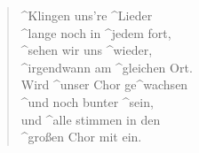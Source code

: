 \documentclass{leadsheet}
\begin{document}
\begin{song}
\begin{multicols}{2}
    \begin{chorus}[after-label=]\end{chorus}


    \begin{verse}
      ^Klingen uns're ^Lieder \\
      ^lange noch in ^jedem fort, \\
      ^sehen wir uns ^wieder, \\
      ^irgendwann am ^gleichen Ort. \\
      Wird ^unser Chor ge^wachsen \\
      ^und noch bunter ^sein, \\
      und ^alle stimmen in den  \\
      ^großen Chor mit ein. \\
    \end{verse}

    \begin{chorus}[after-label=]\end{chorus}

  \end{multicols}
\end{song}
\end{document}
